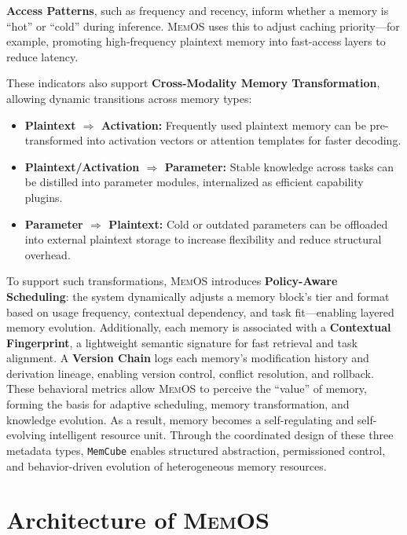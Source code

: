 \documentclass[]{memtensor}
\begin{document}
\textbf{Access Patterns}, such as frequency and recency, inform whether a memory is “hot” or “cold” during inference. \textsc{MemOS} uses this to adjust caching priority—for example, promoting high-frequency plaintext memory into fast-access layers to reduce latency.

These indicators also support \textbf{Cross-Modality Memory Transformation}, allowing dynamic transitions across memory types:
\begin{itemize}
    \item \textbf{Plaintext $\Rightarrow$ Activation:} Frequently used plaintext memory can be pre-transformed into activation vectors or attention templates for faster decoding.
    
    \item \textbf{Plaintext/Activation $\Rightarrow$ Parameter:} Stable knowledge across tasks can be distilled into parameter modules, internalized as efficient capability plugins.

    \item \textbf{Parameter $\Rightarrow$ Plaintext:} Cold or outdated parameters can be offloaded into external plaintext storage to increase flexibility and reduce structural overhead.
\end{itemize}

To support such transformations, \textsc{MemOS} introduces \textbf{Policy-Aware Scheduling}: the system dynamically adjusts a memory block’s tier and format based on usage frequency, contextual dependency, and task fit—enabling layered memory evolution.
Additionally, each memory is associated with a \textbf{Contextual Fingerprint}, a lightweight semantic signature for fast retrieval and task alignment.
A \textbf{Version Chain} logs each memory’s modification history and derivation lineage, enabling version control, conflict resolution, and rollback.
These behavioral metrics allow \textsc{MemOS} to perceive the “value” of memory, forming the basis for adaptive scheduling, memory transformation, and knowledge evolution. As a result, memory becomes a self-regulating and self-evolving intelligent resource unit.
Through the coordinated design of these three metadata types, \texttt{MemCube} enables structured abstraction, permissioned control, and behavior-driven evolution of heterogeneous memory resources.

\section{Architecture of \textsc{MemOS}}
\label{sec:architecture}
\end{document}
